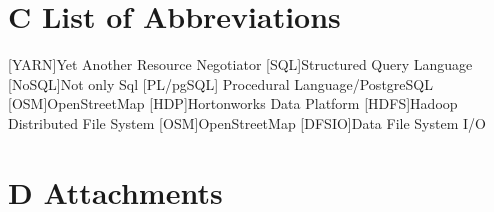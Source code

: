 \documentclass[12pt]{article}
\renewcommand{\listfigurename}{\begingroup
\tocchapter
\tocfile{\listoffigurename}{B Illustration Directory}
\endgroup}
\begin{document}
\newpage


\renewcommand{\listfigurename}{B Illustration Directory}
\listoffigures
\section*{C List of Abbreviations}
\begin{acronym}
[YARN]{Yet Another Resource Negotiator}
 [SQL]{Structured Query Language}
 [NoSQL]{Not only Sql}
[PL/pgSQL] {Procedural Language/PostgreSQL}
[OSM]{OpenStreetMap}
[HDP]{Hortonworks Data Platform}
 [HDFS]{Hadoop Distributed File System}
[OSM]{OpenStreetMap}
[DFSIO]{Data File System I/O}
\end{acronym}
\newpage
\section*{D Attachments}
\end{document}
